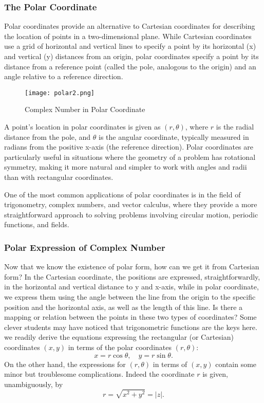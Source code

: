 \subsubsection{The Polar Coordinate}
Polar coordinates provide an alternative to Cartesian coordinates for describing the location of points in a two-dimensional plane. While Cartesian coordinates use a grid of horizontal and vertical lines to specify a point by its horizontal (x) and vertical (y) distances from an origin, polar coordinates specify a point by its distance from a reference point (called the pole, analogous to the origin) and an angle relative to a reference direction.
\begin{figure}[H]
    \centering \label{polar}
    \texttt{[image: polar2.png]}
    \caption{Complex Number in Polar Coordinate}
\end{figure}
A point's location in polar coordinates is given as \( (r, \theta) \), where \( r \) is the radial distance from the pole, and \( \theta \) is the angular coordinate, typically measured in radians from the positive x-axis (the reference direction). Polar coordinates are particularly useful in situations where the geometry of a problem has rotational symmetry, making it more natural and simpler to work with angles and radii than with rectangular coordinates.

One of the most common applications of polar coordinates is in the field of trigonometry, complex numbers, and vector calculus, where they provide a more straightforward approach to solving problems involving circular motion, periodic functions, and fields.

\subsubsection{Polar Expression of Complex Number}
Now that we know the existence of polar form, how can we get it from Cartesian form? In the Cartesian coordinate,
the positions are expressed, straightforwardly, in the horizontal and vertical distance to y and x-axis, while in polar
coordinate, we express them using the angle between the line from the origin to the specific position and the horizontal axis, as well
as the length of this line. Is there a mapping or relation between the points in these two types of coordinates? Some clever students
may have noticed that trigonometric functions are the keys here.
we readily derive the equations expressing the rectangular (or Cartesian) coordinates $(x, y)$ in terms of the polar coordinates $(r, \theta)$:
\begin{equation}
x = r \cos \theta, \quad y = r \sin \theta. 
\end{equation}
On the other hand, the expressions for $(r, \theta)$ in terms of $(x, y)$ contain some minor but troublesome complications. Indeed the coordinate $r$ is given, unambiguously, by
\begin{equation}
r = \sqrt{x^2 + y^2} = |z|. 
\end{equation}

